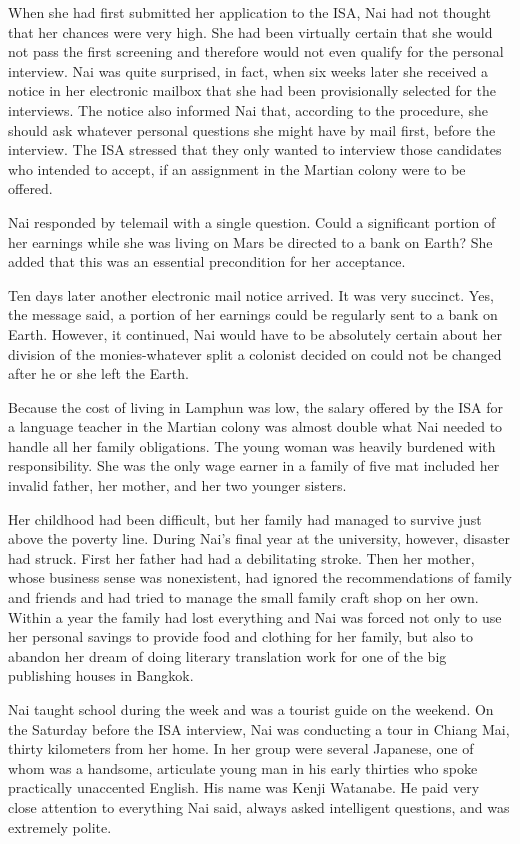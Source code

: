 \documentclass[]{article}
\begin{document}
{When she had first submitted her application to the ISA, Nai had not thought that her chances were very high. She had been virtually certain that she would not pass the first screening and therefore would not even qualify for the personal interview. Nai was quite surprised, in fact, when six weeks later she received a notice in her electronic mailbox that she had been provisionally selected for the interviews. The notice also informed Nai that, according to the procedure, she should ask whatever personal questions she might have by mail first, before the interview. The ISA stressed that they only wanted to interview those candidates who intended to accept, if an assignment in the Martian colony were to be offered.

Nai responded by telemail with a single question. Could a significant portion of her earnings while she was living on Mars be directed to a bank on Earth? She added that this was an essential precondition for her acceptance.

Ten days later another electronic mail notice arrived. It was very succinct. Yes, the message said, a portion of her earnings could be regularly sent to a bank on Earth. However, it continued, Nai would have to be absolutely certain about her division of the monies-whatever split a colonist decided on could not be changed after he or she left the Earth.

Because the cost of living in Lamphun was low, the salary offered by the ISA for a language teacher in the Martian colony was almost double what Nai needed to handle all her family obligations. The young woman was heavily burdened with responsibility. She was the only wage earner in a family of five mat included her invalid father, her mother, and her two younger sisters.

Her childhood had been difficult, but her family had managed to survive just above the poverty line. During Nai’s final year at the university, however, disaster had struck. First her father had had a debilitating stroke. Then her mother, whose business sense was nonexistent, had ignored the recommendations of family and friends and had tried to manage the small family craft shop on her own. Within a year the family had lost everything and Nai was forced not only to use her personal savings to provide food and clothing for her family, but also to abandon her dream of doing literary translation work for one of the big publishing houses in Bangkok.

Nai taught school during the week and was a tourist guide on the weekend. On the Saturday before the ISA interview, Nai was conducting a tour in Chiang Mai, thirty kilometers from her home. In her group were several Japanese, one of whom was a handsome, articulate young man in his early thirties who spoke practically unaccented English. His name was Kenji Watanabe. He paid very close attention to everything Nai said, always asked intelligent questions, and was extremely polite.

}
\end{document}
